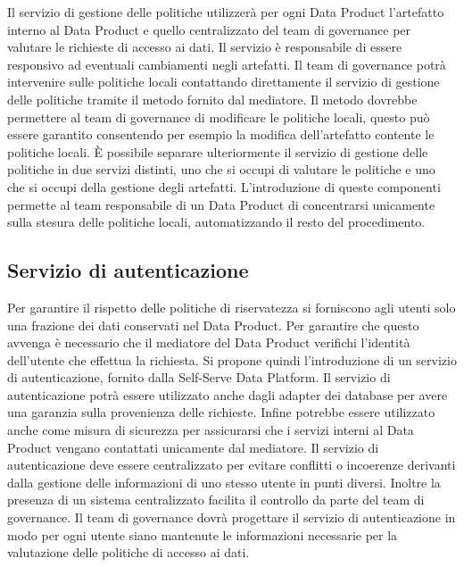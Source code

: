 \documentclass[12pt]{report}
\begin{document}
Il servizio di gestione delle politiche utilizzerà per ogni Data Product l'artefatto interno al Data Product e quello centralizzato del team di governance per valutare le richieste di accesso ai dati.
Il servizio è responsabile di essere responsivo ad eventuali cambiamenti negli artefatti.
Il team di governance potrà intervenire sulle politiche locali contattando direttamente il servizio di gestione delle politiche tramite il metodo fornito dal mediatore. 
Il metodo dovrebbe permettere al team di governance di modificare le politiche locali, questo può essere garantito consentendo per esempio la modifica dell'artefatto contente le politiche locali. 
È possibile separare ulteriormente il servizio di gestione delle politiche in due servizi distinti, uno che si occupi di valutare le politiche e uno che si occupi della gestione degli artefatti.
L'introduzione di queste componenti permette al team responsabile di un Data Product di concentrarsi unicamente sulla stesura delle politiche locali, automatizzando il resto del procedimento.

\subsection{Servizio di autenticazione}
Per garantire il rispetto delle politiche di riservatezza si forniscono agli utenti solo una frazione dei dati conservati nel Data Product.
Per garantire che questo avvenga è necessario che il mediatore del Data Product verifichi l'identità dell'utente che effettua la richiesta.
Si propone quindi l'introduzione di un servizio di autenticazione, fornito dalla Self-Serve Data Platform.
Il servizio di autenticazione potrà essere utilizzato  anche dagli adapter dei database per avere una garanzia sulla provenienza delle richieste.
Infine potrebbe essere utilizzato anche come misura di sicurezza per assicurarsi che i servizi interni al Data Product vengano contattati unicamente dal mediatore.
Il servizio di autenticazione deve essere centralizzato per evitare conflitti o incoerenze derivanti dalla gestione delle informazioni di uno stesso utente in punti diversi.
Inoltre la presenza di un sistema centralizzato facilita il controllo da parte del team di governance.
Il team di governance dovrà progettare il servizio di autenticazione in modo per ogni utente siano mantenute le informazioni necessarie per la valutazione delle politiche di accesso ai dati.
\end{document}
